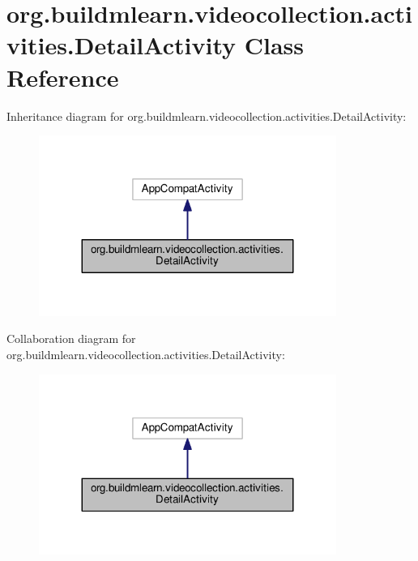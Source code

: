 \hypertarget{classorg_1_1buildmlearn_1_1videocollection_1_1activities_1_1DetailActivity}{}\section{org.\+buildmlearn.\+videocollection.\+activities.\+Detail\+Activity Class Reference}
\label{classorg_1_1buildmlearn_1_1videocollection_1_1activities_1_1DetailActivity}


Inheritance diagram for org.\+buildmlearn.\+videocollection.\+activities.\+Detail\+Activity\+:
\nopagebreak
\begin{figure}[H]
\begin{center}
\leavevmode
\includegraphics[width=275pt]{classorg_1_1buildmlearn_1_1videocollection_1_1activities_1_1DetailActivity__inherit__graph}
\end{center}
\end{figure}


Collaboration diagram for org.\+buildmlearn.\+videocollection.\+activities.\+Detail\+Activity\+:
\nopagebreak
\begin{figure}[H]
\begin{center}
\leavevmode
\includegraphics[width=275pt]{classorg_1_1buildmlearn_1_1videocollection_1_1activities_1_1DetailActivity__coll__graph}
\end{center}
\end{figure}
